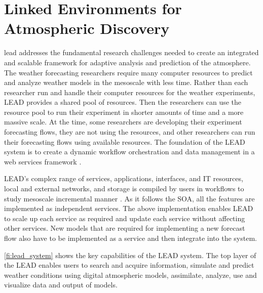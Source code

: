 \section{Linked Environments for Atmospheric Discovery}
\label{se:lead}

\acrfull{lead} \cite{Droegemeier2005Service-OrientedWeather} addresses the fundamental research challenges needed to create an integrated and scalable framework for adaptive analysis and prediction of the atmosphere. The weather forecasting researchers require many computer resources to predict and analyze weather models in the mesoscale with less time. Rather than each researcher run and handle their computer resources for the weather experiments, LEAD provides a shared pool of resources. Then the researchers can use the resource pool to run their experiment in shorter amounts of time and a more massive scale. At the time, some researchers are developing their experiment forecasting flows, they are not using the resources, and other researchers can run their forecasting flows using available resources. The foundation of the LEAD system is to create a dynamic workflow orchestration and data management in a web services framework \cite{Droegemeier2005Service-OrientedWeather}.

LEAD's complex range of services, applications, interfaces, and IT resources, local and external networks, and storage is compiled by users in workflows to study mesoscale incremental manner \cite{Droegemeier2005Service-OrientedWeather}. As it follows the SOA, all the features are implemented as independent services. The above implementation enables LEAD to scale up each service as required and update each service without affecting other services. New models that are required for implementing a new forecast flow also have to be implemented as a service and then integrate into the system.

\cref{fi:lead_system} shows the key capabilities of the LEAD system. The top layer of the LEAD enables users to search and acquire information, simulate and predict weather conditions using digital atmospheric models, assimilate, analyze, use and visualize data and output of models.


